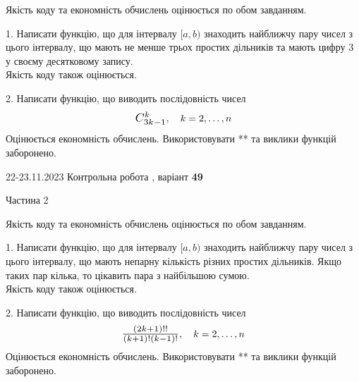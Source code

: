 \documentclass[12pt, ukrainian]{article}
\begin{document}
{{{{{{{{{{{{{{{{{{{{
\begin {Large}
Якість коду та економність обчислень оцінюється по обом завданням.

\vspace{5mm}

1. Написати функцію, що для інтервалу $[a, b)$ знаходить найближчу пару чисел з цього інтервалу, що мають не менше трьох простих дільників та мають цифру 3 у своєму десятковому запису.\\	Якість коду також оцінюється. 



\vspace{10mm}



2. 
Написати функцію, що виводить послідовність чисел
$$\scalebox{1.2}{$C_{3k-1}^{k}$}, \quad k=2,\ldots,n$$
Оцінюється економність обчислень. Використовувати ** та виклики функцій заборонено.

\end{Large}\newpage




\begin {Huge}
{{22-23.11.2023 Контрольна робота , варіант  \No \textbf { 49 }\par}}

\begin{center}Частина 2
\end{center}
\vspace{10mm}
\end {Huge}

{
\begin {Large}
Якість коду та економність обчислень оцінюється по обом завданням.

\vspace{5mm}

1. Написати функцію, що для інтервалу $[a, b)$ знаходить найближчу пару чисел з цього інтервалу, що мають непарну кількість різних простих дільників. Якщо таких пар кілька, то цікавить пара з найбільшою сумою.\\	Якість коду також оцінюється. 



\vspace{10mm}



2. 
Написати функцію, що виводить послідовність чисел
$$\scalebox{1.2}{$\frac{(2k+1)!!}{(k+1)!(k-1)!}$}, \quad k=2,\ldots,n$$
Оцінюється економність обчислень. Використовувати ** та виклики функцій заборонено.


\end{Large}}}}}}}}}}}}}}}}}}}}}}
\end{document}
